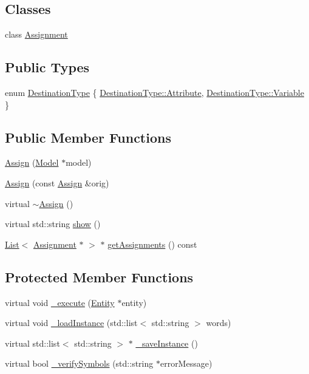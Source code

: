 \subsection*{Classes}
\begin{DoxyCompactItemize}
\item 
class \hyperlink{class_assign_1_1_assignment}{Assignment}
\end{DoxyCompactItemize}
\subsection*{Public Types}
\begin{DoxyCompactItemize}
\item 
enum \hyperlink{class_assign_ae0f42117c12a8d0bc2bf0b7574070694}{Destination\-Type} \{ \hyperlink{class_assign_ae0f42117c12a8d0bc2bf0b7574070694af2bbdf9f72c085adc4d0404e370f0f4c}{Destination\-Type\-::\-Attribute}, 
\hyperlink{class_assign_ae0f42117c12a8d0bc2bf0b7574070694a47c14840d8e15331fa420b9b2f757cd9}{Destination\-Type\-::\-Variable}
 \}
\end{DoxyCompactItemize}
\subsection*{Public Member Functions}
\begin{DoxyCompactItemize}
\item 
\hyperlink{class_assign_afaa746a0ce157d4606823ad508dc6281}{Assign} (\hyperlink{class_model}{Model} $\ast$model)
\item 
\hyperlink{class_assign_ae4945adcf1b5dcdd3f57faa9dd85a2b0}{Assign} (const \hyperlink{class_assign}{Assign} \&orig)
\item 
virtual \hyperlink{class_assign_aa005626af06022d9101c5e38e794dc47}{$\sim$\-Assign} ()
\item 
virtual std\-::string \hyperlink{class_assign_af5022b92204adcd9ee3e444b7e316d07}{show} ()
\item 
\hyperlink{class_list}{List}$<$ \hyperlink{class_assign_1_1_assignment}{Assignment} $\ast$ $>$ $\ast$ \hyperlink{class_assign_aca4aaa2185cc8770e56e1b6928c33dc0}{get\-Assignments} () const 
\end{DoxyCompactItemize}
\subsection*{Protected Member Functions}
\begin{DoxyCompactItemize}
\item 
virtual void \hyperlink{class_assign_a5fabf69268b2e65d8b01ce247be87a40}{\-\_\-execute} (\hyperlink{class_entity}{Entity} $\ast$entity)
\item 
virtual void \hyperlink{class_assign_a95e3169a6ae13ef3dc6dd9f0dde16c30}{\-\_\-load\-Instance} (std\-::list$<$ std\-::string $>$ words)
\item 
virtual std\-::list$<$ std\-::string $>$ $\ast$ \hyperlink{class_assign_a8b38a0a1bec283f5d2f44f67be5a4a6b}{\-\_\-save\-Instance} ()
\item 
virtual bool \hyperlink{class_assign_a5f3a7d8a7214574fea926cae1b1acb94}{\-\_\-verify\-Symbols} (std\-::string $\ast$error\-Message)
\end{DoxyCompactItemize}
